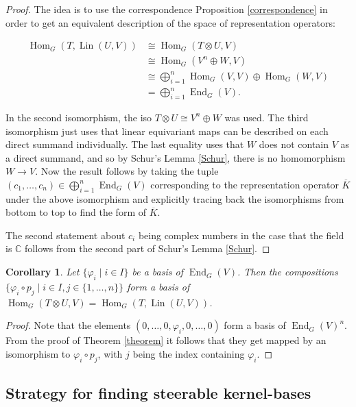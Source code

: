 \documentclass[12pt, a4paper]{article}
\theoremstyle{plain}
\newtheorem{cor}[pro]{Corollary}
\theoremstyle{definition}
\theoremstyle{remark}
\newcommand{\C}{\mathds{C}}
\DeclareMathOperator{\lin}{Lin}
\DeclareMathOperator{\End}{End}
\DeclareMathOperator{\Hom}{Hom}
\begin{document}
\begin{proof}
The idea is to use the correspondence Proposition \ref{correspondence} in order to get an equivalent description of the space of representation operators:

\begin{align*}
\Hom_G(T, \lin(U, V)) & \cong \Hom_G(T \otimes U, V) \\
& \cong \Hom_G(V^n \oplus W, V) \\
& \cong \bigoplus_{i = 1}^{n} \Hom_G(V, V) \oplus \Hom_G(W, V) \\
& = \bigoplus_{i = 1}^{n} \End_G(V).
\end{align*}

In the second isomorphism, the iso $T \otimes U \cong V^n \oplus W$ was used. The third isomorphism just uses that linear equivariant maps can be described on each direct summand individually. The last equality uses that $W$ does not contain $V$ as a direct summand, and so by Schur's Lemma \ref{Schur}, there is no homomorphism $W \to V$. Now the result follows by taking the tuple $(c_1, \dots, c_n) \in \bigoplus_{i = 1}^{n} \End_G(V)$ corresponding to the representation operator $\overline{K}$ under the above isomorphism and explicitly tracing back the isomorphisms from bottom to top to find the form of $\overline{K}$.

The second statement about $c_i$ being complex numbers in the case that the field is $\C$ follows from the second part of Schur's Lemma \ref{Schur}.
\end{proof}

\begin{cor}\label{corollary}
Let $\{ \varphi_i \mid i \in I \}$ be a basis of $\End_G(V)$. Then the compositions $\{ \varphi_i \circ p_j \mid i \in I, j \in \{1, \dots, n\} \}$ form a basis of $\Hom_G(T \otimes U, V) = \Hom_G(T, \lin(U, V))$.
\end{cor}

\begin{proof}
Note that the elements $(0, \dots, 0, \varphi_i, 0, \dots, 0)$ form a basis of $\End_G(V)^n$. From the proof of Theorem \ref{theorem} it follows that they get mapped by an isomorphism to $\varphi_i \circ p_j$, with $j$ being the index containing $\varphi_i$.
\end{proof}



\subsection{Strategy for finding steerable kernel-bases}
\end{document}
